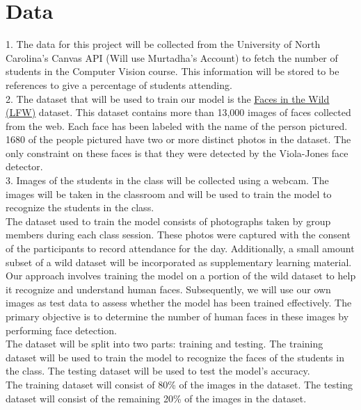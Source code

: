 \section{Data}
1. The data for this project will be collected from the University of North Carolina's Canvas API (Will use Murtadha's Account) to fetch the number of students in the Computer Vision course. This information will be stored to be references to give a percentage of students attending.\\
2. The dataset that will be used to train our model is the \href{http://vis-www.cs.umass.edu/lfw/}{\underline{Faces in the Wild (LFW)}} dataset. This dataset contains more than 13,000 images of faces collected from the web. Each face has been labeled with the name of the person pictured. 1680 of the people pictured have two or more distinct photos in the dataset. The only constraint on these faces is that they were detected by the Viola{-}Jones face detector.\\
3. Images of the students in the class will be collected using a webcam. The images will be taken in the classroom and will be used to train the model to recognize the students in the class.\\
The dataset used to train the model consists of photographs taken by group members during each class session. These photos were captured with the consent of the participants to record attendance for the day. Additionally, a small amount subset of a wild dataset will be incorporated as supplementary learning material.\\
Our approach involves training the model on a portion of the wild dataset to help it recognize and understand human faces. Subsequently, we will use our own images as test data to assess whether the model has been trained effectively. The primary objective is to determine the number of human faces in these images by performing face detection.\\
The dataset will be split into two parts: training and testing. The training dataset will be used to train the model to recognize the faces of the students in the class. The testing dataset will be used to test the model's accuracy.\\
The training dataset will consist of 80\% of the images in the dataset. The testing dataset will consist of the remaining 20\% of the images in the dataset.\\


